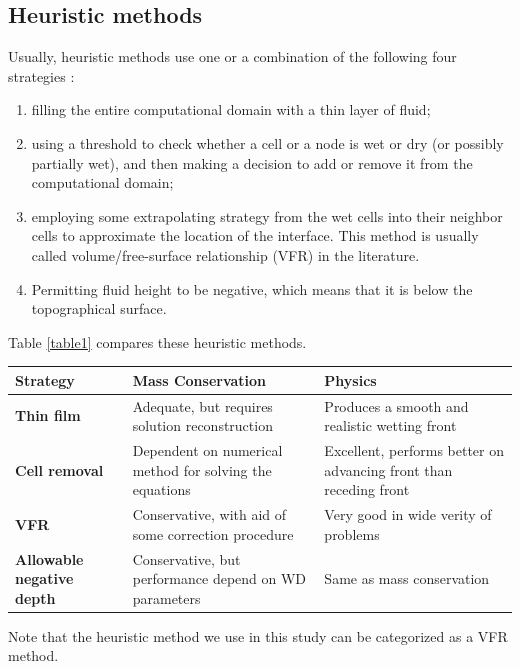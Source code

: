 \documentclass[review]{elsarticle}
\begin{document}
\subsection{  Heuristic methods} \label{Heuristic}
Usually, heuristic methods use one or a combination of the following four strategies \cite{Medeiros2013}: 
\begin{enumerate}
        \item filling the entire computational domain with a thin layer of fluid;
        \item using a threshold to check whether a cell or a node is wet or dry 
         (or possibly partially wet), and then  making a decision to add or remove it 
         from the computational domain;
        \item employing some extrapolating strategy from the wet cells into their neighbor 
         cells to approximate the location of the interface. This method is usually called 
         volume/free-surface relationship (VFR) in the literature.
        \item Permitting fluid height to be negative, which means that it is below the topographical surface.
\end{enumerate}
Table \ref{table1} compares these heuristic methods.
\begin{center}\label{table1}
        \begin{tabular}{|p{}|p{}|p{}|}
                \hline
                {\bf Strategy}                  & {\bf Mass Conservation}                                          & {\bf Physics} \\
                \hline
                {\bf Thin film}                 & Adequate, but requires solution reconstruction 
                & Produces a smooth and realistic wetting front     \\
                \hline 
                {\bf Cell removal}              & Dependent on numerical method for solving the equations          & Excellent, performs better on advancing front than receding front \\
                \hline
                {\bf VFR}                       & Conservative, with aid of some correction procedure              & Very good in wide verity of problems      \\
                \hline
                {\bf Allowable negative depth}  & Conservative, but performance depend on WD parameters            & Same as mass conservation      \\
                \hline
        \end{tabular}
\end{center}
Note that the heuristic method we use in this study can be categorized as a VFR method. 
\end{document}
